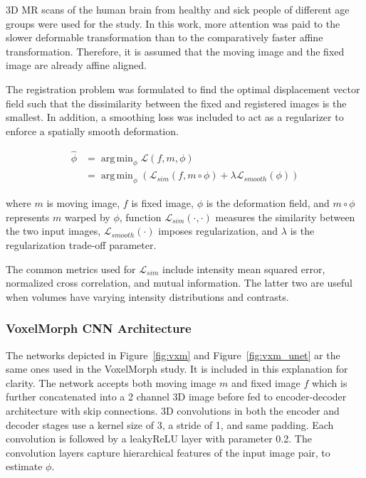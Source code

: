 \documentclass{report}
\DeclareMathOperator*{\argmin}{arg\,min}
\begin{document}
	3D MR scans of the human brain from healthy and sick people of different age groups were used for the study. In this work, more attention was paid to the slower deformable transformation than to the comparatively faster affine transformation. Therefore, it is assumed that the moving image and the fixed image are already affine aligned.
	
	The registration problem was formulated to find the optimal displacement vector field such that the dissimilarity between the fixed and registered images is the smallest. In addition, a smoothing loss was included to act as a regularizer to enforce a spatially smooth deformation.
	
	
	\begin{equation} \label{loss_vxm}
	\begin{split}
	\hat{\phi} & = \argmin_\phi \mathcal{L}(f,m,\phi) \\
	& = \argmin_\phi (\mathcal{L}_{sim}(f,m \circ \phi) + \lambda \mathcal{L}_{smooth}(\phi))
	\end{split}
	\end{equation}
	
	where $m$ is moving image, $f$ is fixed image, $\phi$ is the deformation field, and $m \circ \phi$ represents $m$ warped by $\phi$, function $\mathcal{L}_{sim}(\cdot,\cdot)$ measures the similarity between the two input images, $\mathcal{L}_{smooth}(\cdot)$ imposes regularization, and $\lambda$ is the regularization trade-off parameter.
	
	The common metrics used for $\mathcal{L}_{sim}$ include intensity mean squared error, normalized cross correlation, and mutual information. The latter two are useful when volumes have varying intensity distributions and contrasts.
	
	\subsubsection{VoxelMorph CNN Architecture}
	
	The networks depicted in Figure~\ref{fig:vxm} and Figure~\ref{fig:vxm_unet} ar the same ones used in the VoxelMorph \cite{Balakrishnan_2019} study. It is included in this explanation for clarity. The network accepts both moving image $m$ and fixed image $f$ which is further concatenated into a 2 channel 3D image before fed to encoder-decoder architecture with skip connections. 3D convolutions in both the encoder and decoder stages use a kernel size of 3, a stride of 1, and same padding. Each convolution is followed by a leakyReLU layer with parameter 0.2. The convolution layers capture hierarchical features of the input image pair, to estimate $\phi$.
	
\end{document}
